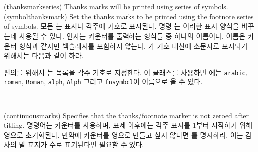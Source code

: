 \begin{syntax}
\cmd{\thanksmarkseries} \\
\cmd{\symbolthanksmark} \\
\end{syntax}
\glossary(thanksmarkseries)%
  {}%
  {Thanks marks will be printed using  series of symbols.}
\glossary(symbolthanksmark)%
  {}
  {Set the thanks marks to be printed using the footnote series of symbols.}
모든 \cmd{\thanks}는 표지나 각주에 기호로 표시된다.
명령 \cmd{\thanksmarkseries}는 이러한 표지 양식을 바꾸는데 사용될 수 있다.
 인자는 카운터를 출력하는 형식들 중 하나의 이름이다.
이름은 카운터 형식과 같지만 백슬래시를 포함하지 않는다.
\cmd{\thanks}가 기호 대신에 소문자로 표시되기 위해서는 다음과 같이 하라.
\begin{lcode}
\end{lcode}
편의를 위해서 \cmd{\symbolthanksmark}는 목록을 각주 기호로
지정한다.
이 클래스를 사용하면 에는 \texttt{arabic}, \texttt{roman},
\texttt{Roman}, \texttt{alph}, \texttt{Alph} 그리고 \texttt{fnsymbol}이
이름으로 올 수 있다.

\begin{syntax}
\cmd{\continuousmarks} \\
\end{syntax}
\glossary(continuousmarks)%
  {}%
  {Specifies that the thanks/footnote marker is not zeroed after titling.}
\cmd{\thanks} 명령어는  카운터를 사용하며, 표제 이후에는 각주
표지를 1부터 시작하기 위해 영으로 초기화된다.
만약에 카운터를 영으로 만들고 싶지 않다면 \cmd{\continuousmarks}를 명시하라.
이는 감사의 말 표지가 수로 표기된다면 필요할 수 있다.

